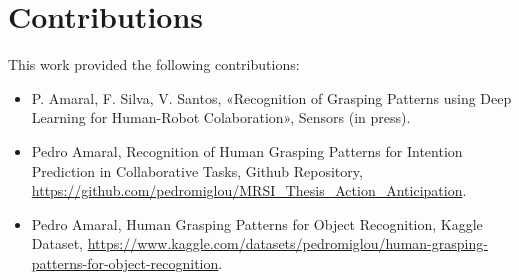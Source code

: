 \section{Contributions}

This work provided the following contributions:


\begin{itemize}
    \item P. Amaral, F. Silva, V. Santos, «Recognition of Grasping Patterns using Deep Learning for Human-Robot Colaboration», Sensors (in press).
    \item Pedro Amaral, Recognition of Human Grasping Patterns for Intention Prediction in Collaborative Tasks, Github Repository, \url{https://github.com/pedromiglou/MRSI_Thesis_Action_Anticipation}.
    \item Pedro Amaral, Human Grasping Patterns for Object Recognition, Kaggle Dataset, \url{https://www.kaggle.com/datasets/pedromiglou/human-grasping-patterns-for-object-recognition}.
\end{itemize}
